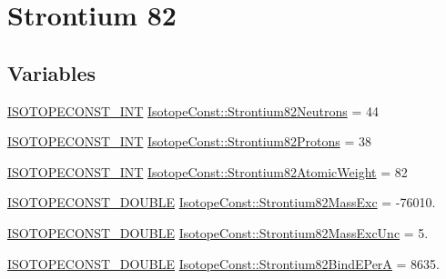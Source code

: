 \hypertarget{group___isotope_const-_strontium-_sr82}{}\section{Strontium 82}
\label{group___isotope_const-_strontium-_sr82}
\subsection*{Variables}
\begin{DoxyCompactItemize}
\item 
\mbox{\hyperlink{group___isotope_const-_macros_ga5f18360b3e99483a35c32d789e62621c}{I\+S\+O\+T\+O\+P\+E\+C\+O\+N\+S\+T\+\_\+\+I\+NT}} \mbox{\hyperlink{group___isotope_const-_strontium-_sr82_ga7a0bcb2caa1f24f7f1829eece714a1ff}{Isotope\+Const\+::\+Strontium82\+Neutrons}} = 44
\item 
\mbox{\hyperlink{group___isotope_const-_macros_ga5f18360b3e99483a35c32d789e62621c}{I\+S\+O\+T\+O\+P\+E\+C\+O\+N\+S\+T\+\_\+\+I\+NT}} \mbox{\hyperlink{group___isotope_const-_strontium-_sr82_ga7e57ae59fc9f8a143c73696786af2d66}{Isotope\+Const\+::\+Strontium82\+Protons}} = 38
\item 
\mbox{\hyperlink{group___isotope_const-_macros_ga5f18360b3e99483a35c32d789e62621c}{I\+S\+O\+T\+O\+P\+E\+C\+O\+N\+S\+T\+\_\+\+I\+NT}} \mbox{\hyperlink{group___isotope_const-_strontium-_sr82_ga9300c3d1252e8798bdc962376fafd256}{Isotope\+Const\+::\+Strontium82\+Atomic\+Weight}} = 82
\item 
\mbox{\hyperlink{group___isotope_const-_macros_ga8f45a7272ce02c0b4c65c44636ed719a}{I\+S\+O\+T\+O\+P\+E\+C\+O\+N\+S\+T\+\_\+\+D\+O\+U\+B\+LE}} \mbox{\hyperlink{group___isotope_const-_strontium-_sr82_ga7234365e027352cf3762146e723a89aa}{Isotope\+Const\+::\+Strontium82\+Mass\+Exc}} = -\/76010.
\item 
\mbox{\hyperlink{group___isotope_const-_macros_ga8f45a7272ce02c0b4c65c44636ed719a}{I\+S\+O\+T\+O\+P\+E\+C\+O\+N\+S\+T\+\_\+\+D\+O\+U\+B\+LE}} \mbox{\hyperlink{group___isotope_const-_strontium-_sr82_ga9debd5a318cd784622a8c7e63282bcaa}{Isotope\+Const\+::\+Strontium82\+Mass\+Exc\+Unc}} = 5.
\item 
\mbox{\hyperlink{group___isotope_const-_macros_ga8f45a7272ce02c0b4c65c44636ed719a}{I\+S\+O\+T\+O\+P\+E\+C\+O\+N\+S\+T\+\_\+\+D\+O\+U\+B\+LE}} \mbox{\hyperlink{group___isotope_const-_strontium-_sr82_ga5d2f9fbd19357e9c3efcebf5f0a36bf9}{Isotope\+Const\+::\+Strontium82\+Bind\+E\+PerA}} = 8635.
\item 

\end{DoxyCompactItemize}
